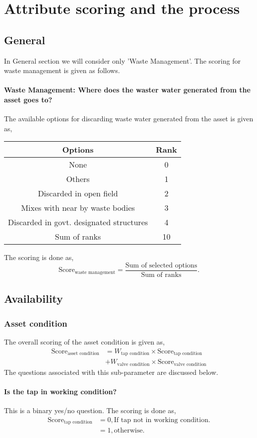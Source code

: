 \documentclass[oneside,twocolumn]{article}
\newcommand{\tsub}[2]{\text{#1}_{\text{#2}}}
\newcommand{\tsubb}[2]{#1_{\text{#2}}}
\newcommand{\dsub}[2]{\dfrac{\text{#1}}{\text{#2}}}
\newenvironment{ttable}
{
\begin{center}
\begin{tabular}{c|c}
\hline
}
{
\\ \hline
\end{tabular}
\end{center}
}
\begin{document}
\section{Attribute scoring and the process}
\subsection{General}
In General section we will consider only 'Waste Management'. The scoring for waste management is given as follows.
\paragraph{Waste Management: Where does the waster water generated from the asset goes to?}
The available options for discarding waste water generated from the asset is given as,
\begin{ttable}
	Options & Rank \\ \hline
	None & 0 \\
	Others & 1 \\
	Discarded in open field & 2 \\
	Mixes with near by waste bodies & 3 \\
	Discarded in govt. designated structures & 4 \\ \hline
	Sum of ranks & 10  
\end{ttable}

The scoring is done as,
\[
	\tsub{Score}{waste management} = \dsub{Sum of selected options}{Sum of ranks}.
\]

\subsection{Availability}
\subsubsection{Asset condition}
The overall scoring of the asset condition is given as,
\begin{align*}
	\tsub{Score}{asset condition} &= \tsubb{W}{tap condition} \times \tsub{Score}{tap condition} \\
	&+ \tsubb{W}{valve condition} \times \tsub{Score}{valve condition}
\end{align*}
The questions associated with this sub-parameter are discussed below.
\paragraph{Is the tap in working condition?} 
This is a binary yes/no question. The scoring is done as,
\begin{align*}
	\tsub{Score}{tap condition} &= 0, \text{If tap not in working condition}. \\
	&= 1, \text{otherwise}.
\end{align*}
\end{document}
